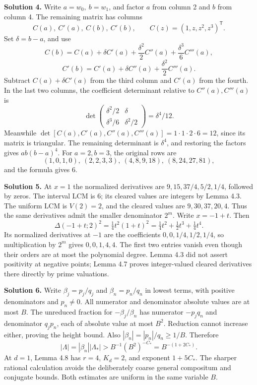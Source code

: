 \documentclass[
  11pt,
  a4paper,
]{article}
\begin{document}
\textbf{Solution 4.} Write \(a=w_0,\ b=w_1\), and factor \(a\) from
column 2 and \(b\) from column 4. The remaining matrix has columns \[
C(a),\ C'(a),\ C(b),\ C'(b),\qquad
C(z)=(1,z,z^2,z^3)^{\mathsf T}.
\] Set \(\delta=b-a\), and use \[
C(b)=C(a)+\delta C'(a)+\frac{\delta^2}{2}C''(a)
+\frac{\delta^3}{6}C'''(a),
\] \[
C'(b)=C'(a)+\delta C''(a)+\frac{\delta^2}{2}C'''(a).
\] Subtract \(C(a)+\delta C'(a)\) from the third column and \(C'(a)\)
from the fourth. In the last two columns, the coefficient determinant
relative to \(C''(a),C'''(a)\) is \[
\det\begin{pmatrix}\delta^2/2&\delta\\
\delta^3/6&\delta^2/2\end{pmatrix}
=\delta^4/12.
\] Meanwhile \(\det[C(a),C'(a),C''(a),C'''(a)]=1\cdot1\cdot2\cdot6=12\),
since its matrix is triangular. The remaining determinant is
\(\delta^4\), and restoring the factors gives \(ab(b-a)^4\). For
\(a=2,b=3\), the original rows are \[
(1,0,1,0),\ (2,2,3,3),\ (4,8,9,18),\ (8,24,27,81),
\] and the formula gives \(6\).

\textbf{Solution 5.} At \(x=1\) the normalized derivatives are
\(9,15,37/4,5/2,1/4\), followed by zeros. The interval LCM is \(6\); its
cleared values are integers by Lemma 4.3. The uniform LCM is \(V(2)=2\),
and the cleared values are \(9,30,37,20,4\). Thus the same derivatives
admit the smaller denominator \(2^m\). Write \(x=-1+t\). Then \[
\Delta(-1+t;2)^2=\tfrac14t^2(1+t)^2
=\tfrac14t^2+\tfrac12t^3+\tfrac14t^4.
\] Its normalized derivatives at \(-1\) are the coefficients
\(0,0,1/4,1/2,1/4\), so multiplication by \(2^m\) gives \(0,0,1,4,4\).
The first two entries vanish even though their orders are at most the
polynomial degree. Lemma 4.3 did not assert positivity at negative
points; Lemma 4.7 proves integer-valued cleared derivatives there
directly by prime valuations.

\textbf{Solution 6.} Write \(\beta_j=p_j/q_j\) and \(\beta_n=p_n/q_n\)
in lowest terms, with positive denominators and \(p_n\ne0\). All
numerator and denominator absolute values are at most \(B\). The
unreduced fraction for \(-\beta_j/\beta_n\) has numerator \(-p_jq_n\)
and denominator \(q_jp_n\), each of absolute value at most \(B^2\).
Reduction cannot increase either, proving the height bound. Also
\(|\beta_n|=|p_n|/q_n\ge1/B\). Therefore \[
|\Lambda|=|\beta_n||\Lambda_*|
>B^{-1}(B^2)^{-C_*}=B^{-(1+2C_*)}.
\] At \(d=1\), Lemma 4.8 has \(r=4\), \(K_d=2\), and exponent
\(1+5C_*\). The sharper rational calculation avoids the deliberately
coarse general compositum and conjugate bounds. Both estimates are
uniform in the same variable \(B\).
\end{document}
